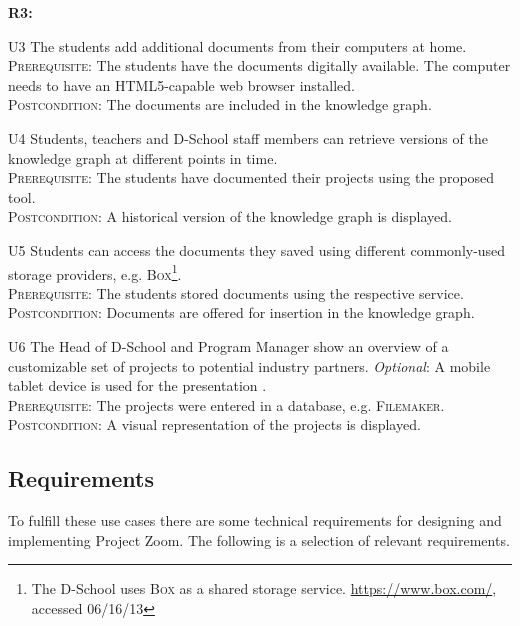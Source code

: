\begin{labeling}{\textbf{R3:}}

\item[U3\label{uc:fromhome}] The students add additional documents from their computers at home.\\
\textsc{Prerequisite}: The students have the documents digitally available. The computer needs to have an HTML5-capable web browser installed.\\
\textsc{Postcondition}: The documents are included in the knowledge graph.


\item[U4\label{uc:versions}] Students, teachers and D-School staff members can retrieve versions of the knowledge graph at different points in time.\\
\textsc{Prerequisite}: The students have documented their projects using the proposed tool.\\
\textsc{Postcondition}: A historical version of the knowledge graph is displayed.

\item[U5\label{uc:storageproviders}] Students can access the documents they saved using different commonly-used storage pro\-vi\-ders, e.g. \textsc{Box}\footnote{The D-School uses \textsc{Box} as a shared storage service. \url{https://www.box.com/}, accessed 06/16/13}.\\
\textsc{Prerequisite}: The students stored documents using the respective service.\\
\textsc{Postcondition}: Documents are offered for insertion in the knowledge graph.

\item[U6\label{uc:multiplatform}] The Head of D-School and Program Manager show an overview of a customizable set of pro\-jects to potential industry partners. \textit{Optional}:  A mobile tablet device is used for the presentation .\\
\textsc{Prerequisite}: The projects were entered in a database, e.g. \textsc{Filemaker}.\\
\textsc{Postcondition}: A visual representation of the projects is displayed.
\end{labeling}

\subsection{Requirements}

To fulfill these use cases there are some technical requirements for designing and implementing Project Zoom. The following is a selection of relevant requirements.

